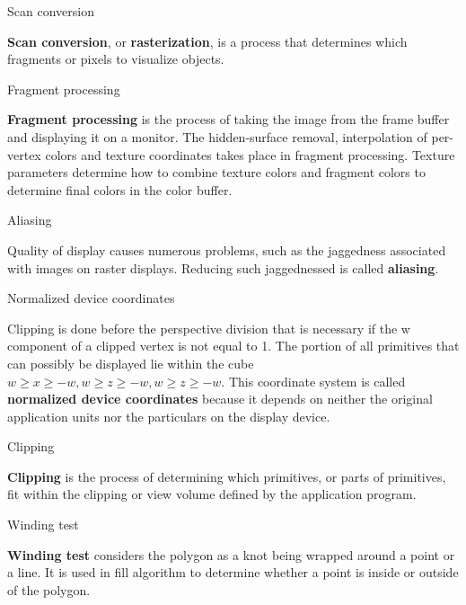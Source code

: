 \documentclass[10pt,a4paper]{article}
\begin{document}
\begin{enumerate}
		{\large \item Scan conversion}
			
			\textbf{Scan conversion}, or \textbf{rasterization}, is a process that determines which fragments or pixels to visualize objects.\\
			
		{\large \item Fragment processing}
				
			\textbf{Fragment processing} is the process of taking the image from the frame buffer and displaying it on a monitor. The hidden-surface removal, interpolation of per-vertex colors and texture coordinates takes place in fragment processing. Texture parameters determine how to combine texture colors and fragment colors to determine final colors in the color buffer.\\
				
		{\large \item Aliasing }
				
			Quality of display causes numerous problems, such as the jaggedness associated with images on raster displays. Reducing such jaggednessed is called \textbf{aliasing}.\\
			
		{\large \item Normalized device coordinates}
				
			Clipping is done before the perspective division that is necessary if the w component of a clipped vertex is not equal to 1. The portion of all primitives that can possibly be displayed lie within the cube $ w \ge x \ge -w, w \ge z \ge -w, w \ge z \ge -w. $ This coordinate system is called \textbf{normalized device coordinates} because it depends on neither the original application units nor the particulars on the display device.\\
			
		{\large \item Clipping}
				
			\textbf{Clipping} is the process of determining which primitives, or parts of primitives, fit within the clipping or view volume defined by the application program.\\
			
		{\large \item Winding test}
				
			 \textbf{Winding test} considers the polygon as a knot being wrapped around a point or a line. It is used in fill algorithm to determine whether a point is inside or outside of the polygon.\\
			 

\end{enumerate}
\end{document}
